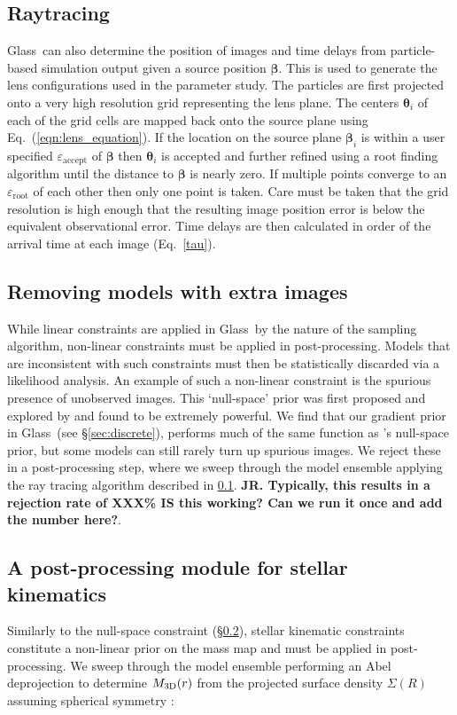 \documentclass[galley,usenatbib]{mn2e}
\newcommand{\Glass}{{\sc Glass}}
\newcommand{\eps}{\ensuremath{\varepsilon}}
\newcommand{\hilight}[1]{{\bf \color{red} #1}}
\newcommand{\eqnref}[1] {Eq.~(\ref{#1})}
\newcommand{\eqnrefp}[1] {(Eq.~\ref{#1})}
\renewcommand{\vec}[1]{\ensuremath{\boldsymbol{#1}}}
\begin{document}
\subsection{Raytracing}\label{Raytracing}
\Glass\ can also determine the position of images and time delays from 
particle-based simulation output given a source position $\vec\beta$. This is
used to generate the lens configurations used in the parameter study.  The
particles are first projected onto a very high resolution grid representing the
lens plane. The centers $\vec\theta_i$ of each of the grid cells are mapped
back onto the source plane using \eqnref{eqn:lens_equation}. If the location on
the source plane $\vec\beta_i$ is within a user specified
$\eps_\mathrm{accept}$ of $\vec\beta$ then $\vec\theta_i$ is 
accepted and further refined using a root finding algorithm until the distance
to $\vec\beta$ is nearly zero. If multiple points converge to an
$\eps_\mathrm{root}$ of each other then only one point is taken.  Care must be
taken that the grid resolution is high enough that the resulting image position
error is below the equivalent observational error. Time delays are then
calculated in order of the arrival time at each image \eqnrefp{tau}.

\subsection{Removing models with extra images}\label{sec:glassextraimages} 
While linear constraints are applied in \Glass\ by the nature of the sampling
algorithm, non-linear constraints must be applied in post-processing. Models
that are inconsistent with such constraints must then be statistically
discarded via a likelihood analysis. An example of such a non-linear constraint
is the spurious presence of unobserved images. This `null-space' prior was
first proposed and explored by \citet{2006MNRAS.367.1209L} and found to be
extremely powerful. We find that our gradient prior in \Glass\ (see
\S\ref{sec:discrete}), performs much of the same function as
\citeauthor{2006MNRAS.367.1209L}'s null-space prior, but some models can still
rarely turn up spurious images. We reject these in a post-processing step,
where we sweep through the model ensemble applying the ray tracing algorithm
described in \ref{Raytracing}. \hilight{JR. Typically, this results in a rejection rate of XXX\% IS this working? Can we run it once and add the number here?}. 

\subsection{A post-processing module for stellar kinematics}\label{sec:glasskinematics} 
Similarly to the null-space constraint (\S\ref{sec:glassextraimages}), stellar
kinematic constraints constitute a non-linear prior on the mass map and must be
applied in post-processing. We sweep through the model ensemble performing an
Abel deprojection to determine $M_{\rm 3D}(r)$ from the projected surface density $\Sigma(R)$
assuming spherical symmetry \citep[e.g.][]{2008gady.book.....B,2008MNRAS.390.1647B}: 
\end{document}
